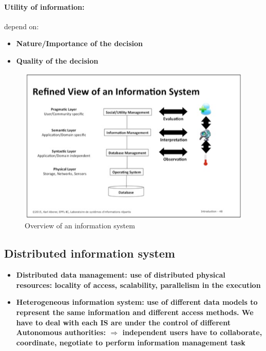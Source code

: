 \paragraph{Utility of information:} depend on:
\begin{itemize}
	\item \bf{Nature/Importance} of the decision
	\item \bf{Quality} of the decision
\end{itemize}

\begin{figure}[!h]
\begin{center}
\includegraphics[width=1\linewidth]{figures/viewIS.jpg}
\end{center}
\caption{Overview of an information system}
\end{figure}

\subsection{Distributed information system}
\begin{itemize}
	\item \bf{Distributed data management:} use of distributed physical resources: locality of access, scalability, parallelism in the execution
	\item \bf{Heterogeneous information system:} use of different data models to represent the same information and different access methods. We have to deal with each IS are under the control of different \bf{Autonomous authorities:} $\Rightarrow$ independent users have to collaborate, coordinate, negotiate to perform information management task
\end{itemize}

